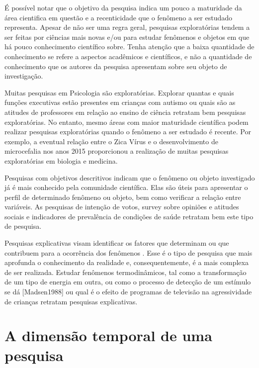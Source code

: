 \documentclass[
]{book}
\begin{document}
É possível notar que o objetivo da pesquisa indica um pouco a maturidade da área cientifica em questão e a recenticidade que o fenômeno a ser estudado representa. Apesar de não ser uma regra geral, pesquisas exploratórias tendem a ser feitas por ciências mais novas e/ou para estudar fenômenos e objetos em que há pouco conhecimento científico sobre. Tenha atenção que a baixa quantidade de conhecimento se refere a aspectos acadêmicos e científicos, e não a quantidade de conhecimento que os autores da pesquisa apresentam sobre seu objeto de investigação.

Muitas pesquisas em Psicologia são exploratórias. Explorar quantas e quais funções executivas estão presentes em crianças com autismo \citep{Skogli2020} ou quais são as atitudes de professores em relação ao ensino de ciência \citep{Jones1994} retratam bem pesquisas exploratórias. No entanto, mesmo áreas com maior maturidade científica podem realizar pesquisas exploratórias quando o fenômeno a ser estudado é recente. Por exemplo, a eventual relação entre o Zica Vírus e o desenvolvimento de microcefalia nos anos 2015 proporcionou a realização de muitas pesquisas exploratórias em biologia e medicina.

Pesquisas com objetivos descritivos indicam que o fenômeno ou objeto investigado já é mais conhecido pela comunidade científica. Elas são úteis para apresentar o perfil de determinado fenômeno ou objeto, bem como verificar a relação entre variáveis. As pesquisas de intenção de votos, survey sobre opiniões e atitudes sociais e indicadores de prevalência de condições de saúde retratam bem este tipo de pesquisa.

Pesquisas explicativas visam identificar os fatores que determinam ou que contribuem para a ocorrência dos fenômenos \citep{gil2002}. Esse é o tipo de pesquisa que mais aprofunda o conhecimento da realidade e, consequentemente, é a mais complexa de ser realizada. Estudar fenômenos termodinâmicos, tal como a transformação de um tipo de energia em outra, ou como o processo de detecção de um estímulo se dá {[}Madsen1988{]} ou qual é o efeito de programas de televisão na agressividade de crianças \citeyearpar{Bandura1961} retratam pesquisas explicativas.

\hypertarget{a-dimensuxe3o-temporal-de-uma-pesquisa}{%
\section{A dimensão temporal de uma pesquisa}\label{a-dimensuxe3o-temporal-de-uma-pesquisa}}
\end{document}
